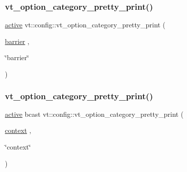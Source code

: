 \subsubsection{\texorpdfstring{vt\+\_\+option\+\_\+category\+\_\+pretty\+\_\+print()}{vt\_option\_category\_pretty\_print()}\hspace{0.1cm}{\footnotesize\ttfamily [2/17]}}
{\footnotesize\ttfamily \hyperlink{namespacevt_1_1config_a6bd1d6215bda0d8ca02811798399f689a82f77c67af0c363709010c6df4dbd920}{active} vt\+::config\+::vt\+\_\+option\+\_\+category\+\_\+pretty\+\_\+print (\begin{DoxyParamCaption}\item[{\hyperlink{namespacevt_1_1config_a6bd1d6215bda0d8ca02811798399f689a39d4d58fa73c76f6cb97e6dc20e0d1c0}{barrier}}]{,  }\item[{\char`\"{}barrier\char`\"{}}]{ }\end{DoxyParamCaption})}

\mbox{\label{namespacevt_1_1config_adabe5e9e0a4d6da22e038e180a3d86bc}} 
\subsubsection{\texorpdfstring{vt\+\_\+option\+\_\+category\+\_\+pretty\+\_\+print()}{vt\_option\_category\_pretty\_print()}\hspace{0.1cm}{\footnotesize\ttfamily [3/17]}}
{\footnotesize\ttfamily \hyperlink{namespacevt_1_1config_a6bd1d6215bda0d8ca02811798399f689a82f77c67af0c363709010c6df4dbd920}{active} bcast vt\+::config\+::vt\+\_\+option\+\_\+category\+\_\+pretty\+\_\+print (\begin{DoxyParamCaption}\item[{\hyperlink{namespacevt_1_1config_a6bd1d6215bda0d8ca02811798399f689a5dad3be974af03e75e234cb475c2cb20}{context}}]{,  }\item[{\char`\"{}context\char`\"{}}]{ }\end{DoxyParamCaption})}

\mbox{\label{namespacevt_1_1config_a800674810a686d86da67dbca704b750a}} 
